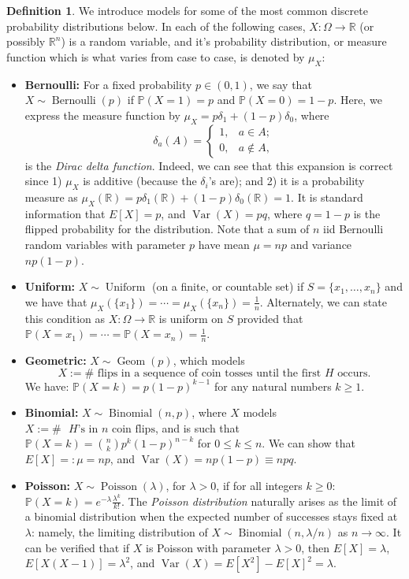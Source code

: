 \documentclass[12pt,reqno]{article}
\renewcommand{\emph}[1]{\textit{#1}}
\theoremstyle{plain}
\theoremstyle{definition}
\newtheorem{definition}[theorem]{Definition}
\newcommand{\PP}[1]{\ensuremath{\mathbb{P}\left(#1\right)}}
\begin{document}
\begin{definition}
We introduce models for some of the most common discrete probability distributions 
below. In each of the following cases, $X: \Omega \rightarrow \mathbb{R}$ (or 
possibly $\mathbb{R}^n$) is a random variable, and it's probability 
distribution, or measure function which is what varies from case to case, 
is denoted by $\mu_X$: 
\begin{itemize} 

\item \textbf{Bernoulli:} For a fixed probability $p \in (0, 1)$, we say that 
     $X \sim \operatorname{Bernoulli}(p)$ if $\PP{X = 1} = p$ and $\PP{X = 0} = 1-p$. 
     Here, we express the measure function by $\mu_X = p\delta_1 + (1-p)\delta_0$, where 
     $$\delta_a(A) = \begin{cases} 1, & a \in A; \\ 0, & a \notin A, \end{cases}$$ is 
     the \emph{Dirac delta function}. Indeed, we can see that this expansion is 
     correct since 1) $\mu_X$ is additive (because the $\delta_i$'s are); and 
     2) it is a probability measure as 
     $\mu_X(\mathbb{R}) = p \delta_1(\mathbb{R}) + (1-p) \delta_0(\mathbb{R}) = 1$. 
     It is standard information that $E[X] = p$, and $\operatorname{Var}(X) = pq$, where 
     $q = 1-p$ is the flipped probability for the distribution. 
     Note that a sum of $n$ iid Bernoulli random variables with parameter 
     $p$ have mean $\mu = np$ and variance $np(1-p)$. 
\item \textbf{Uniform:} $X \sim \operatorname{Uniform}$ (on a finite, or countable set) 
     if $S = \{x_1,\ldots,x_n\}$ and we have that $\mu_X(\{x_1\}) = \cdots = \mu_X(\{x_n\}) = \frac{1}{n}$. 
     Alternately, we can state this condition as $X: \Omega \rightarrow \mathbb{R}$ is uniform on $S$ 
     provided that $\PP{X = x_1} = \cdots = \PP{X = x_n} = \frac{1}{n}$. 
\item \textbf{Geometric:} $X \sim \operatorname{Geom}(p)$, which models 
     $$X := \#\text{ flips in a sequence of coin tosses until the first $H$ occurs}.$$ 
     We have: $\PP{X = k} = p(1-p)^{k-1}$ for any natural numbers $k \geq 1$. 
\item \textbf{Binomial:} $X \sim \operatorname{Binomial}(n, p)$, where $X$ models 
     $X := \#\text{ $H$'s in $n$ coin flips}$, and is such that 
     $\PP{X = k} = \binom{n}{k} p^k(1-p)^{n-k}$ for $0 \leq k \leq n$. 
     We can show that $E[X] =: \mu = np$, and 
     $\operatorname{Var}(X) = np(1-p) \equiv npq$. 
\item \textbf{Poisson:} $X \sim \operatorname{Poisson}(\lambda)$, for $\lambda > 0$, if 
     for all integers $k \geq 0$: $\PP{X = k} = e^{-\lambda} \frac{\lambda^k}{k!}$. The 
     \emph{Poisson distribution} naturally arises as the limit of a 
     binomial distribution when the expected number of successes stays 
     fixed at $\lambda$: namely, the limiting distribution of 
     $X \sim \operatorname{Binomial}(n, \lambda / n)$ as 
     $n \rightarrow \infty$. It can be verified that if $X$ is 
     Poisson with parameter $\lambda > 0$, then 
     $E[X] = \lambda$, $E[X(X-1)] = \lambda^2$, and 
     $\operatorname{Var}(X) = E[X^2]-E[X]^2 = \lambda$. 


\end{itemize}
\end{definition}
\end{document}
